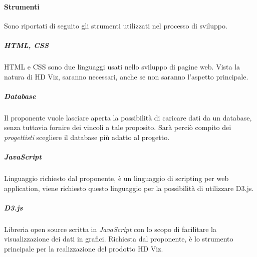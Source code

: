 \paragraph{Strumenti}

Sono riportati di seguito gli strumenti utilizzati nel processo di sviluppo.

\subparagraph{HTML, CSS}

HTML e CSS sono due linguaggi usati nello sviluppo di pagine web. Vista la natura di HD Viz, saranno necessari, anche 
se non saranno l'aspetto principale.

\subparagraph{Database}

Il proponente vuole lasciare aperta la possibilità di caricare dati da un database, senza tuttavia fornire dei vincoli 
a tale proposito. Sarà perciò compito dei \emph{progettisti} scegliere il database più adatto al progetto.

\subparagraph{JavaScript}

Linguaggio richiesto dal proponente, è un linguaggio di scripting per web application, viene richiesto questo 
linguaggio per la possibilità di utilizzare D3.js.

\subparagraph{D3.js}

Libreria open source scritta in \emph{JavaScript} con lo scopo di facilitare la visualizzazione dei dati in grafici. 
Richiesta dal proponente, è lo strumento principale per la realizzazione del prodotto HD Viz.